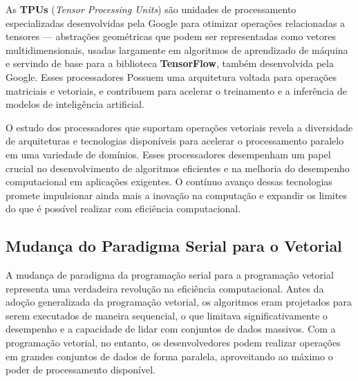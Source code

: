 \documentclass[12pt, %
openright, 
oneside, %
a4paper,    %
brazil]{facom-ufu-abntex2}
\begin{document}

As \textbf{TPUs} (\textit{Tensor Processing Units}) são unidades de processamento especializadas desenvolvidas pela Google para otimizar operações relacionadas a tensores --- abstrações geométricas que podem ser representadas como vetores multidimensionais, usadas largamente em algoritmos de aprendizado de máquina e servindo de base para a biblioteca \textbf{TensorFlow}, também desenvolvida pela Google. Esses processadores Possuem uma arquitetura voltada para operações matriciais e vetoriais, e contribuem para acelerar o treinamento e a inferência de modelos de inteligência artificial.

O estudo dos processadores que suportam operações vetoriais revela a diversidade de arquiteturas e tecnologias disponíveis para acelerar o processamento paralelo em uma variedade de domínios. Esses processadores desempenham um papel crucial no desenvolvimento de algoritmos eficientes e na melhoria do desempenho computacional em aplicações exigentes. O contínuo avanço dessas tecnologias promete impulsionar ainda mais a inovação na computação e expandir os limites do que é possível realizar com eficiência computacional.




\subsection{Mudança do Paradigma Serial para o Vetorial}

A mudança de paradigma da programação serial para a programação vetorial representa uma verdadeira revolução na eficiência computacional. Antes da adoção generalizada da programação vetorial, os algoritmos eram projetados para serem executados de maneira sequencial, o que limitava significativamente o desempenho e a capacidade de lidar com conjuntos de dados massivos. Com a programação vetorial, no entanto, os desenvolvedores podem realizar operações em grandes conjuntos de dados de forma paralela, aproveitando ao máximo o poder de processamento disponível.

\end{document}
